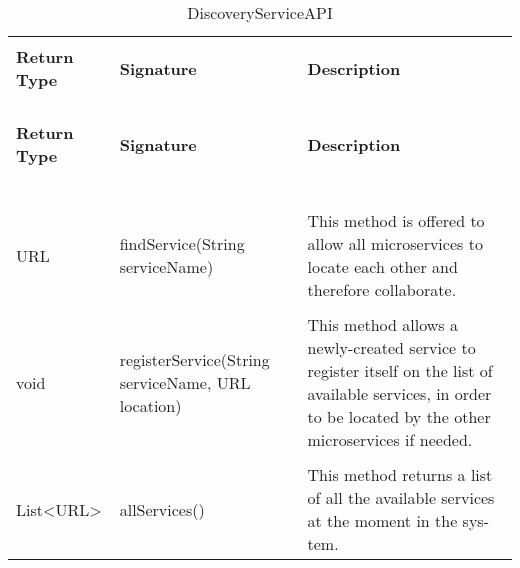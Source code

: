 \begin{longtable}{p{}p{}p{}}
    \caption{DiscoveryServiceAPI}
    \vspace{0.5em}\\
    \hline
    \vspace{0.5em}\\
    \textbf{Return Type} & \textbf{Signature} & \textbf{Description} \\
    \vspace{0.5em}\\
    \hline
    \vspace{0.5em}\\
    \endfirsthead
    \vspace{0.5em}\\
    \hline
    \vspace{0.5em}\\
    \textbf{Return Type} & \textbf{Signature} & \textbf{Description} \\
    \vspace{0.5em}\\
    \hline
    \vspace{0.5em}\\
    \endhead
    
    \vspace{0.5em}\\
    \hline
    \vspace{0.5em}\\
    \endfoot
    
    \vspace{0.5em}\\
    \hline
    \vspace{0.5em}\\
    \endlastfoot
    
    URL &
    findService(String serviceName) &
    This method is offered
    to allow all microservices
    to locate each other and
    therefore collaborate. \\
    \vspace{0.5em}\\
    void &
    registerService(String serviceName, URL location) &
    This method allows a
    newly-created service to
    register itself on the list of
    available services, in order
    to be located by the other
    microservices if needed. \\
    \vspace{0.5em}\\
    List<URL> &
    allServices() &
    This method returns a list
    of all the available services
    at the moment in the sys-
    tem. \\

\end{longtable}

